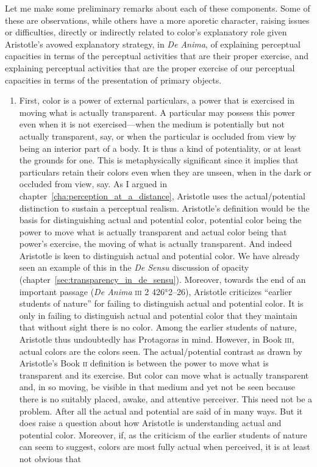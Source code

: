 Let me make some preliminary remarks about each of these components. Some of these are observations, while others have a more aporetic character, raising issues or difficulties, directly or indirectly related to color's explanatory role given Aristotle's avowed explanatory strategy, in \emph{De Anima}, of explaining perceptual capacities in terms of the perceptual activities that are their proper exercise, and explaining perceptual activities that are the proper exercise of our perceptual capacities in terms of the presentation of primary objects.
\begin{enumerate}[(1)]
	\item First, color is a power of external particulars, a power that is exercised in moving what is actually transparent. A particular may possess this power even when it is not exercised---when the medium is potentially but not actually transparent, say, or when the particular is occluded from view by being an interior part of a body. It is thus a kind of potentiality, or at least the grounds for one. This is metaphysically significant since it implies that particulars retain their colors even when they are unseen, when in the dark or occluded from view, say. As I argued in chapter~\ref{cha:perception_at_a_distance}, Aristotle uses the actual/potential distinction to sustain a perceptual realism. Aristotle's definition would be the basis for distinguishing actual and potential color, potential color being the power to move what is actually transparent and actual color being that power's exercise, the moving of what is actually transparent. And indeed Aristotle is keen to distinguish actual and potential color. We have already seen an example of this in the \emph{De Sensu} discussion of opacity (chapter~\ref{sec:transparency_in_de_sensu}). Moreover, towards the end of an important passage (\emph{De Anima} \textsc{iii} 2 426\( ^{a} \)2--26), Aristotle criticizes ``earlier students of nature'' for failing to distinguish actual and potential color. It is only in failing to distinguish actual and potential color that they maintain that without sight there is no color. Among the earlier students of nature, Aristotle thus undoubtedly has Protagoras in mind. However, in Book \textsc{iii}, actual colors are the colors seen. The actual/potential contrast as drawn by Aristotle's Book \textsc{ii} definition is between the power to move what is transparent and its exercise. But color can move what is actually transparent and, in so moving, be visible in that medium and yet not be seen because there is no suitably placed, awake, and attentive perceiver. This need not be a problem. After all the actual and potential are said of in many ways. But it does raise a question about how Aristotle is understanding actual and potential color. Moreover, if, as the criticism of the earlier students of nature can seem to suggest, colors are most fully actual when perceived, it is at least not obvious that 
\end{enumerate}
